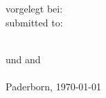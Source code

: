 \begin{titlepage}
\begin{center}
    \ifgerman
        vorgelegt bei:\\
    \else
        submitted to:\\
    \fi

    {\large \FirstExaminer \\
    \ifgerman
        und
    \else
        and
    \fi
    \\[6pt]
    \large \SecondExaminer}\\[20pt]

    {Paderborn, \today}

\end{center}
\end{titlepage}
\clearpage
